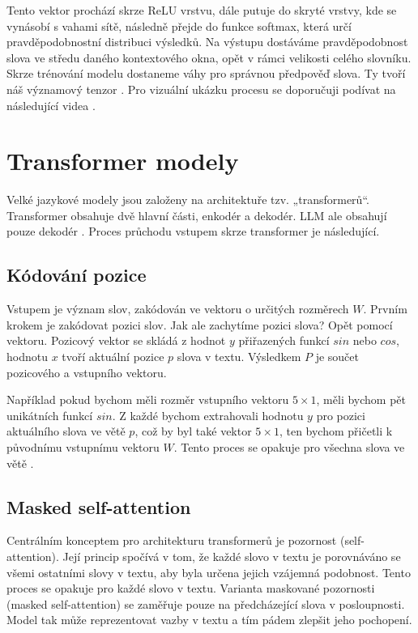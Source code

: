 \documentclass[FM,DP]{tulthesis}
\begin{document}
		Tento vektor prochází skrze ReLU vrstvu, dále putuje do skryté vrstvy, kde se vynásobí s vahami sítě, následně přejde do funkce softmax, která určí pravděpodobnostní distribuci výsledků. Na výstupu dostáváme pravděpodobnost slova ve středu daného kontextového okna, opět v rámci velikosti celého slovníku. Skrze trénování modelu dostaneme váhy pro správnou předpověď slova. Ty tvoří náš významový tenzor \cite{paper:word2vec} \cite{tokenization}. Pro vizuální ukázku procesu se doporučuji podívat na následující videa \cite{ytb:embeddings} \cite{ytb:word2vec}.
		
		\section{Transformer modely} \label{transformers}
		Velké jazykové modely jsou založeny na architektuře tzv. „transformerů“. Transformer obsahuje dvě hlavní části, enkodér a dekodér. LLM ale obsahují pouze dekodér \cite{rothman2021transformers}. Proces průchodu vstupem skrze transformer je následující.
		
		\subsection{Kódování pozice}
		Vstupem je význam slov, zakódován ve vektoru o určitých rozměrech $W$. Prvním krokem je zakódovat pozici slov. Jak ale zachytíme pozici slova? Opět pomocí vektoru. Pozicový vektor se skládá z hodnot $y$ přiřazených funkcí $sin$ nebo $cos$, hodnotu $x$ tvoří aktuální pozice $p$ slova v textu. Výsledkem $P$ je součet pozicového a vstupního vektoru. 
		
		Například pokud bychom měli rozměr vstupního vektoru $5 \times 1$, měli bychom pět unikátních funkcí $sin$. Z každé bychom extrahovali hodnotu $y$ pro pozici aktuálního slova ve větě $p$, což by byl také vektor $5 \times 1$, ten bychom přičetli k původnímu vstupnímu vektoru $W$. Tento proces se opakuje pro všechna slova ve větě \cite{rothman2021transformers}. 
		
		\subsection{Masked self-attention}
		Centrálním konceptem pro architekturu transformerů je pozornost (self-attention). Její princip spočívá v tom, že každé slovo v textu je porovnáváno se všemi ostatními slovy v textu, aby byla určena jejich vzájemná podobnost. Tento proces se opakuje pro každé slovo v textu. Varianta maskované pozornosti (masked self-attention) se zaměřuje pouze na předcházející slova v posloupnosti. Model tak může reprezentovat vazby v textu a tím pádem zlepšit jeho pochopení.
		
\end{document}
